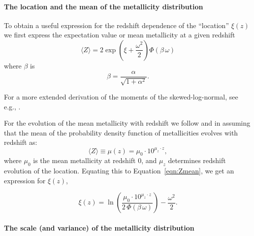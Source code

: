 \documentclass[twocolumn]{aastex631}
\begin{document}
\paragraph{The location and the mean of the metallicity distribution}
To obtain a useful expression for the redshift dependence of the ``location'' $\xi(z)$ we first express the expectation value or mean metallicity at a given redshift
\begin{equation}
 \langle  Z \rangle 
 = 2 \exp
        \left(\xi +  \frac{\omega^2}{2} \right)
         \Phi\left(\beta\, \omega\right)
 \label{eqn:Zmean}
\end{equation}
where $\beta$ is 
\begin{equation}
\label{eq: beta}
\beta = \frac{\alpha}{\sqrt{1 + \alpha^2} }.
\end{equation}

For a more extended derivation of the moments of the skewed-log-normal, see e.g., \cite{WANG201995}.

\noindent For the evolution of the mean metallicity with redshift we follow \cite{Langer2006} and \cite{Neijssel+2019} in assuming that the mean of the probability density function of metallicities evolves with redshift as:
\begin{equation}
\label{eq: mean Z}
    \langle Z \rangle \equiv \mu(z) = \mu_0 \cdot 10^{\mu_z \cdot z},
\end{equation}
where $\mu_0
$ is the mean metallicity at redshift 0, and $\mu_z
$ determines redshift evolution of the location. Equating this to Equation~\ref{eqn:Zmean}, we get an expression for $\xi(z)$,


\begin{equation}
\label{eq mu z}
    \xi(z) = \ln\left(\frac{  \mu_0 \cdot 10^{\mu_z \cdot z} }{2\, \Phi(\beta\, \omega)}  \right) - \frac{\omega^2}{2}.
\end{equation}

\paragraph{The scale (and variance) of the metallicity distribution}
\end{document}
